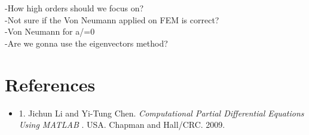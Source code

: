 \documentclass[a4paper,10pt,twoside]{article}
\begin{document}
-How high orders should we focus on?\\
-Not sure if the Von Neumann applied on FEM is correct?\\
-Von Neumann for a/=0\\
-Are we gonna use the eigenvectors method?

\begin{comment}
J. D. D. Basabe and M. K. Sen, “Stability of the high-order finite elements for acoustic or elastic wave
propagation with high-order time stepping,” Geophysical Journal International, vol. 181, no. 1, pp. 577–590,
2010.

\end{comment}


\section{References}
\begin{itemize}
    \item 
    1. Jichun Li and Yi-Tung Chen. \textit{Computational Partial
Differential Equations
Using MATLAB }. USA. Chapman and Hall/CRC. 2009. 
\end{itemize}




\end{document}
